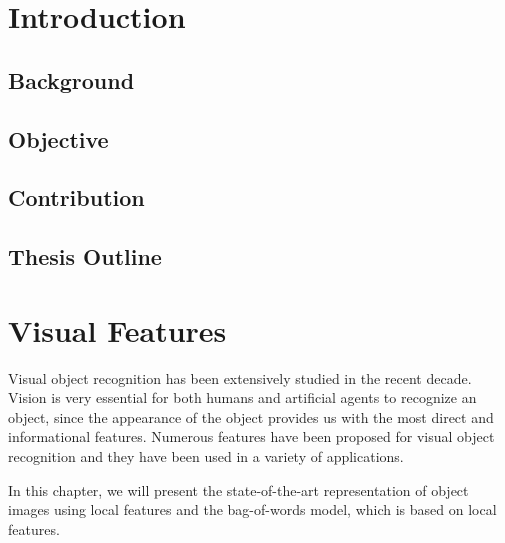\documentclass[12pt,final,twoside]{report}
\theoremstyle{plain}
\theoremstyle{definition}
\theoremstyle{remark}
\begin{document}

\chapter{Introduction}
\section{Background}
\section{Objective}
\section{Contribution}
\section{Thesis Outline}


\cleardoublepage
\chapter{Visual Features}
Visual object recognition has been extensively studied in the recent decade. Vision is very essential for both humans and artificial agents to recognize an object, since the appearance of the object provides us with the most direct and informational features. Numerous features have been proposed for visual object recognition and they have been used in a variety of applications.

In this chapter, we will present the state-of-the-art representation of object images using local features and the bag-of-words model, which is based on local features.
\end{document}
